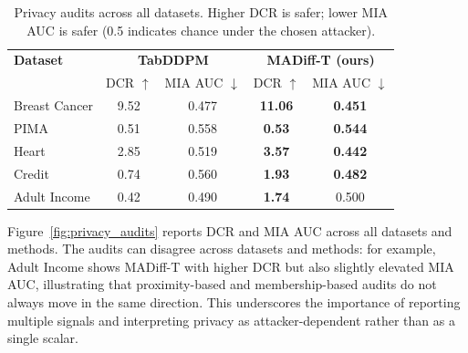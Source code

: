 \documentclass[preprint,12pt]{elsarticle}
\begin{document}
\begin{table}[!t]
\centering
\caption{Privacy audits across all datasets. Higher DCR is safer; lower MIA AUC is safer (0.5 indicates chance under the chosen attacker).}
\label{tab:results_privacy_all}
\scriptsize
\setlength{\tabcolsep}{5.5pt}
\renewcommand{\arraystretch}{1.15}
\begin{tabular}{l|c c|c c}
\rowcolor{gray!20}
\textbf{Dataset} &
\multicolumn{2}{c|}{\textbf{TabDDPM}} &
\multicolumn{2}{c}{\textbf{MADiff-T (ours)}} \\
\rowcolor{gray!20}
& DCR $\uparrow$ & MIA AUC $\downarrow$ & DCR $\uparrow$ & MIA AUC $\downarrow$ \\
\hline
Breast Cancer & 9.52 & 0.477 & \textbf{11.06} & \textbf{0.451} \\
PIMA          & 0.51 & 0.558 & \textbf{0.53}  & \textbf{0.544} \\
Heart         & 2.85 & 0.519 & \textbf{3.57}  & \textbf{0.442} \\
Credit        & 0.74 & 0.560 & \textbf{1.93}  & \textbf{0.482} \\
Adult Income  & 0.42 & 0.490 & \textbf{1.74}  & 0.500          \\
\end{tabular}
\end{table}

Figure~\ref{fig:privacy_audits} reports DCR and MIA AUC across all datasets and methods. The audits can disagree across datasets and methods: for example, Adult Income shows MADiff-T with higher DCR but also slightly elevated MIA AUC, illustrating that proximity-based and membership-based audits do not always move in the same direction. This underscores the importance of reporting multiple signals and interpreting privacy as attacker-dependent rather than as a single scalar.
\end{document}
